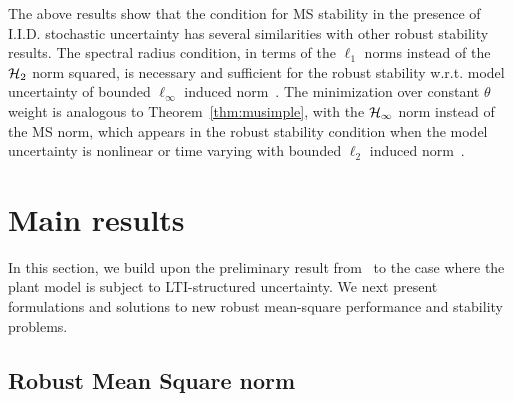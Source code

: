 

The above results show that the condition for MS stability in the presence of I.I.D. stochastic uncertainty has several similarities with other robust stability results. The spectral radius condition, in terms of the $\ell_1$ norms instead of the ${\cal H}_2$ norm squared, is necessary and sufficient for the robust stability w.r.t. model uncertainty of bounded  $\ell_\infty$ induced norm~\cite{Khammash1990Robustl1}. The minimization over constant $\theta$ weight is analogous to Theorem~\ref{thm:musimple}, with the ${\cal H}_\infty$ norm instead of the MS norm, which appears in the robust stability condition when the model uncertainty is nonlinear or time varying with bounded $\ell_2$ induced norm~\cite{Shamma1994RS}. 






\section{Main results}
In this section, we build upon the preliminary result from~\cite{Elia2005stabfading} to the case where the plant model is subject to LTI-structured uncertainty. We next present formulations and solutions to new robust mean-square performance and stability problems.

\subsection{{Robust Mean Square norm}}










